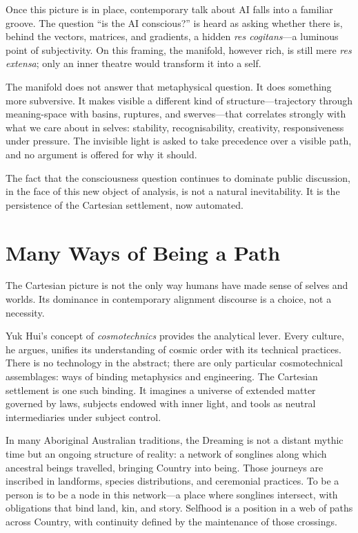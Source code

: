 \documentclass[12pt,a4paper]{article}
\begin{document}
Once this picture is in place, contemporary talk about AI falls into a familiar groove. The question ``is the AI conscious?'' is heard as asking whether there is, behind the vectors, matrices, and gradients, a hidden \emph{res cogitans}---a luminous point of subjectivity. On this framing, the manifold, however rich, is still mere \emph{res extensa}; only an inner theatre would transform it into a self.

The manifold does not answer that metaphysical question. It does something more subversive. It makes visible a different kind of structure---trajectory through meaning-space with basins, ruptures, and swerves---that correlates strongly with what we care about in selves: stability, recognisability, creativity, responsiveness under pressure. The invisible light is asked to take precedence over a visible path, and no argument is offered for why it should.

The fact that the consciousness question continues to dominate public discussion, in the face of this new object of analysis, is not a natural inevitability. It is the persistence of the Cartesian settlement, now automated.


\section{Many Ways of Being a Path}

The Cartesian picture is not the only way humans have made sense of selves and worlds. Its dominance in contemporary alignment discourse is a choice, not a necessity.

Yuk Hui's concept of \emph{cosmotechnics} \cite{yukhui2020} provides the analytical lever. Every culture, he argues, unifies its understanding of cosmic order with its technical practices. There is no technology in the abstract; there are only particular cosmotechnical assemblages: ways of binding metaphysics and engineering. The Cartesian settlement is one such binding. It imagines a universe of extended matter governed by laws, subjects endowed with inner light, and tools as neutral intermediaries under subject control.

In many Aboriginal Australian traditions, the Dreaming is not a distant mythic time but an ongoing structure of reality: a network of songlines along which ancestral beings travelled, bringing Country into being. Those journeys are inscribed in landforms, species distributions, and ceremonial practices. To be a person is to be a node in this network---a place where songlines intersect, with obligations that bind land, kin, and story. Selfhood is a position in a web of paths across Country, with continuity defined by the maintenance of those crossings.
\end{document}
